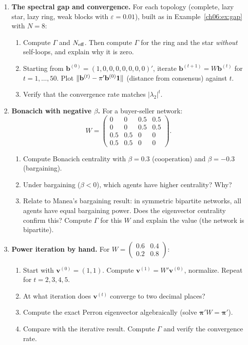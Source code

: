 \documentclass[../structural_economics_book.tex]{subfiles}
\begin{document}
\begin{enumerate}[label=\textbf{6.\arabic*}, leftmargin=3em]
\item \textbf{The spectral gap and convergence.} For each topology (complete, lazy star, lazy ring, weak blocks with $\varepsilon = 0.01$), built as in Example~\ref{ch06:ex:gap} with $N = 8$:
\begin{enumerate}
\item Compute $\Gamma$ and $N_{\text{eff}}$. Then compute $\Gamma$ for the ring and the star \textit{without} self-loops, and explain why it is zero.
\item Starting from $\mathbf{b}^{(0)} = (1, 0, 0, 0, 0, 0, 0, 0)'$, iterate $\mathbf{b}^{(t+1)} = W\mathbf{b}^{(t)}$ for $t = 1, \ldots, 50$. Plot $\|\mathbf{b}^{(t)} - \pi'\mathbf{b}^{(0)}\mathbf{1}\|$ (distance from consensus) against $t$.
\item Verify that the convergence rate matches $|\lambda_2|^t$.
\end{enumerate}

\item \textbf{Bonacich with negative $\beta$.} For a buyer-seller network:
\begin{equation}
W = \begin{pmatrix} 0 & 0 & 0.5 & 0.5 \\ 0 & 0 & 0.5 & 0.5 \\ 0.5 & 0.5 & 0 & 0 \\ 0.5 & 0.5 & 0 & 0 \end{pmatrix}.
\end{equation}
\begin{enumerate}
\item Compute Bonacich centrality with $\beta = 0.3$ (cooperation) and $\beta = -0.3$ (bargaining).
\item Under bargaining ($\beta < 0$), which agents have higher centrality? Why?
\item Relate to Manea's \citeyearpar{manea2011bargaining} bargaining result: in symmetric bipartite networks, all agents have equal bargaining power. Does the eigenvector centrality confirm this? Compute $\Gamma$ for this $W$ and explain the value (the network is bipartite).
\end{enumerate}

\item \textbf{Power iteration by hand.} For $W = \begin{pmatrix} 0.6 & 0.4 \\ 0.2 & 0.8 \end{pmatrix}$:
\begin{enumerate}
\item Start with $\mathbf{v}^{(0)} = (1, 1)$. Compute $\mathbf{v}^{(1)} = W'\mathbf{v}^{(0)}$, normalize. Repeat for $t = 2, 3, 4, 5$.
\item At what iteration does $\mathbf{v}^{(t)}$ converge to two decimal places?
\item Compute the exact Perron eigenvector algebraically (solve $\boldsymbol{\pi}'W = \boldsymbol{\pi}'$).
\item Compare with the iterative result. Compute $\Gamma$ and verify the convergence rate.
\end{enumerate}


\end{enumerate}
\end{document}

